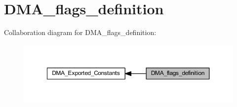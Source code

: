 \hypertarget{group___d_m_a__flags__definition}{}\section{D\+M\+A\+\_\+flags\+\_\+definition}
\label{group___d_m_a__flags__definition}
Collaboration diagram for D\+M\+A\+\_\+flags\+\_\+definition\+:\nopagebreak
\begin{figure}[H]
\begin{center}
\leavevmode
\includegraphics[width=350pt]{group___d_m_a__flags__definition}
\end{center}
\end{figure}
